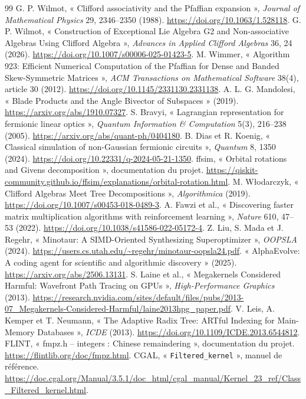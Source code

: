 \documentclass[11pt,a4paper]{article}
\newcommand{\code}[1]{\texttt{#1}}
\begin{document}
\begin{thebibliography}{99}
 G. P. Wilmot, « Clifford associativity and the Pfaffian expansion », \emph{Journal of Mathematical Physics} 29, 2346--2350 (1988). \url{https://doi.org/10.1063/1.528118}.
 G. P. Wilmot, « Construction of Exceptional Lie Algebra G2 and Non-associative Algebras Using Clifford Algebra », \emph{Advances in Applied Clifford Algebras} 36, 24 (2026). \url{https://doi.org/10.1007/s00006-025-01423-5}.
 M. Wimmer, « Algorithm 923: Efficient Numerical Computation of the Pfaffian for Dense and Banded Skew-Symmetric Matrices », \emph{ACM Transactions on Mathematical Software} 38(4), article 30 (2012). \url{https://doi.org/10.1145/2331130.2331138}.
 A. L. G. Mandolesi, « Blade Products and the Angle Bivector of Subspaces » (2019). \url{https://arxiv.org/abs/1910.07327}.
 S. Bravyi, « Lagrangian representation for fermionic linear optics », \emph{Quantum Information \& Computation} 5(3), 216--238 (2005). \url{https://arxiv.org/abs/quant-ph/0404180}.
 B. Dias et R. Koenig, « Classical simulation of non-Gaussian fermionic circuits », \emph{Quantum} 8, 1350 (2024). \url{https://doi.org/10.22331/q-2024-05-21-1350}.
 ffsim, « Orbital rotations and Givens decomposition », documentation du projet. \url{https://qiskit-community.github.io/ffsim/explanations/orbital-rotation.html}.
 M. Włodarczyk, « Clifford Algebras Meet Tree Decompositions », \emph{Algorithmica} (2019). \url{https://doi.org/10.1007/s00453-018-0489-3}.
 A. Fawzi et al., « Discovering faster matrix multiplication algorithms with reinforcement learning », \emph{Nature} 610, 47--53 (2022). \url{https://doi.org/10.1038/s41586-022-05172-4}.
 Z. Liu, S. Mada et J. Regehr, « Minotaur: A SIMD-Oriented Synthesizing Superoptimizer », \emph{OOPSLA} (2024). \url{https://users.cs.utah.edu/~regehr/minotaur-oopsla24.pdf}.
 « AlphaEvolve: A coding agent for scientific and algorithmic discovery » (2025). \url{https://arxiv.org/abs/2506.13131}.
 S. Laine et al., « Megakernels Considered Harmful: Wavefront Path Tracing on GPUs », \emph{High-Performance Graphics} (2013). \url{https://research.nvidia.com/sites/default/files/pubs/2013-07_Megakernels-Considered-Harmful/laine2013hpg_paper.pdf}.
 V. Leis, A. Kemper et T. Neumann, « The Adaptive Radix Tree: ARTful Indexing for Main-Memory Databases », \emph{ICDE} (2013). \url{https://doi.org/10.1109/ICDE.2013.6544812}.
 FLINT, « fmpz.h -- integers : Chinese remaindering », documentation du projet. \url{https://flintlib.org/doc/fmpz.html}.
 CGAL, « \code{Filtered\_kernel} », manuel de référence. \url{https://doc.cgal.org/Manual/3.5.1/doc_html/cgal_manual/Kernel_23_ref/Class_Filtered_kernel.html}.
\end{thebibliography}
\end{document}

